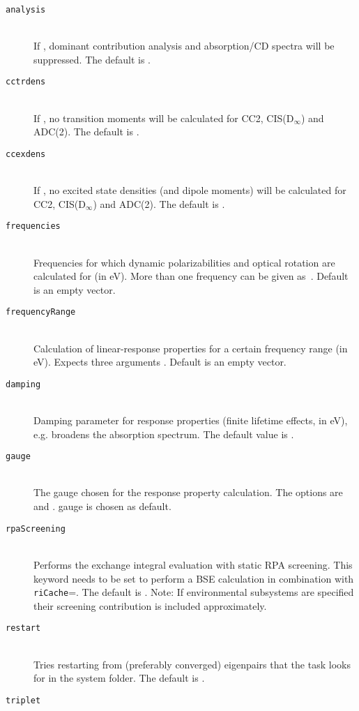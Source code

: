 \begin{description}
    \item [\texttt{analysis}]\hfill \\
    If , dominant contribution analysis and absorption/CD spectra will be suppressed. The default is .
    \item [\texttt{cctrdens}]\hfill \\
    If , no transition moments will be calculated for CC2, CIS(D$_\infty$) and ADC(2). The default is .
    \item [\texttt{ccexdens}]\hfill \\
    If , no excited state densities (and dipole moments) will be calculated for CC2, CIS(D$_\infty$) and ADC(2). The default is .
    \item [\texttt{frequencies}]\hfill \\
    Frequencies for which dynamic polarizabilities and optical rotation are calculated for (in eV). More than one frequency can be given as~. Default is an empty vector.
    \item [\texttt{frequencyRange}]\hfill \\
    Calculation of linear-response properties for a certain frequency range (in eV). Expects three arguments . Default is an empty vector.
    \item [\texttt{damping}]\hfill \\
    Damping parameter for response properties (finite lifetime effects, in eV), e.g. broadens the absorption spectrum. The default value is .
    \item [\texttt{gauge}]\hfill \\
    The gauge chosen for the response property calculation. The options are  and .  gauge is chosen as default.
    \item [\texttt{rpaScreening}]\hfill \\
    Performs the exchange integral evaluation with static RPA screening. This keyword needs to be set to perform a BSE calculation in combination with \texttt{riCache}=. The default is . Note: If environmental subsystems are specified their screening contribution is included approximately. 
    \item [\texttt{restart}]\hfill \\
    Tries restarting from (preferably converged) eigenpairs that the task
    looks for in the system folder. The default is .
    \item [\texttt{triplet}]\hfill \\

\end{description}
